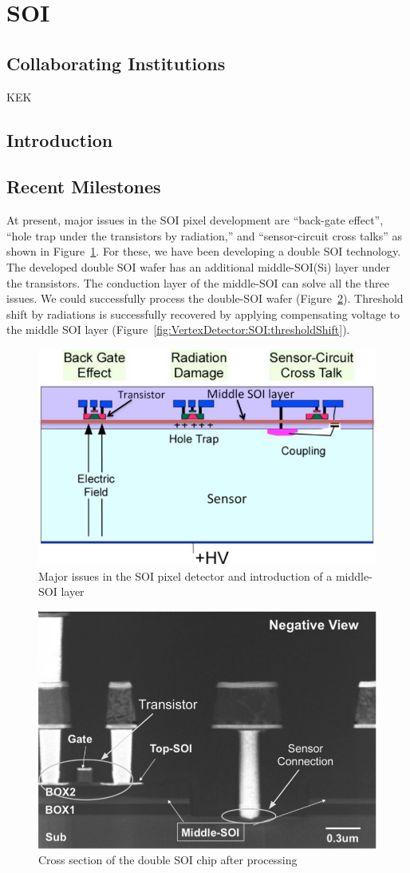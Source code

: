 \section{SOI}
\subsection{Collaborating Institutions}
KEK
\subsection{Introduction}
\subsection{Recent Milestones}
At present, major issues in the SOI pixel development are ``back-gate effect'', ``hole trap under the transistors by radiation,'' and ``sensor-circuit cross talks'' as shown in Figure~\ref{fig:VertexDetector:SOI:SOI_Schematic}. For these, we have been developing a double SOI technology. The developed double SOI wafer has an additional middle-SOI(Si) layer under the transistors. The conduction layer of the middle-SOI can solve all the three issues. We could successfully process the double-SOI wafer (Figure~\ref{fig:VertexDetector:SOI:crossSectionAfterProcessing}). Threshold shift by radiations is successfully recovered by applying compensating voltage to the middle SOI layer (Figure~\ref{fig:VertexDetector:SOI:thresholdShift}).

\begin{figure}
\centering
\includegraphics[width=.5\textwidth]{VertexDetector/SOI/SOI_Schematic}
\caption{Major issues in the SOI pixel detector and introduction of a middle-SOI layer}
\label{fig:VertexDetector:SOI:SOI_Schematic}
\end{figure}

\begin{figure}
\centering
\includegraphics[width=.5\textwidth]{VertexDetector/SOI/crossSectionAfterProcessing}
\caption{Cross section of the double SOI chip after processing}
\label{fig:VertexDetector:SOI:crossSectionAfterProcessing}
\end{figure}

